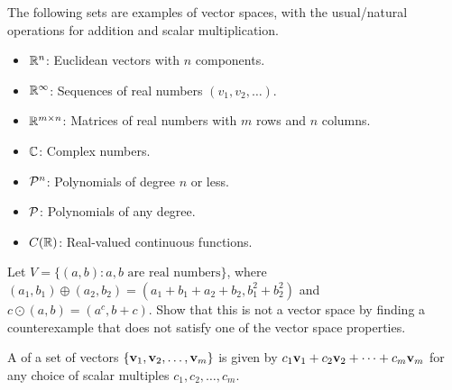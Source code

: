 


\begin{applicationActivities}{2}{8}

\begin{remark}
  The following sets are examples of vector spaces, with the usual/natural
  operations for addition and scalar multiplication.
  \begin{itemize}
    \item \(\IR^n\): Euclidean vectors with \(n\) components.
    \item \(\IR^\infty\): Sequences of real numbers \((v_1,v_2,\dots)\).
    \item \(\IR^{m\times n}\): Matrices of real numbers with \(m\) rows and
          \(n\) columns.
    \item \(\IC\): Complex numbers.
    \item \(\P^n\): Polynomials of degree \(n\) or less.
    \item \(\P\): Polynomials of any degree.
    \item \(C(\IR)\): Real-valued continuous functions.
  \end{itemize}
\end{remark}

\begin{activity}{10}
  Let \(V=\{(a,b):a,b\text{ are real numbers}\}\), where
  \((a_1,b_1)\oplus(a_2,b_2)=
  (a_1+b_1+a_2+b_2,b_1^2+b_2^2)\) and \(c\odot(a,b)=(a^c,b+c)\). Show that
  this is not a vector space by finding a counterexample
  that does not satisfy one of the vector space properties.

  \vectorSpacePropertiesO
\end{activity}

\begin{definition}
  A  of a set of vectors
  \(\{\vect v_1,\vect v_2,\dots,\vect v_m\}\) is given by
  \(c_1\vect v_1+c_2\vect v_2+\dots+c_m\vect v_m\) for any choice of
  scalar multiples \(c_1,c_2,\dots,c_m\).

	\ \\
	\ \\


\end{definition}
\end{applicationActivities}
